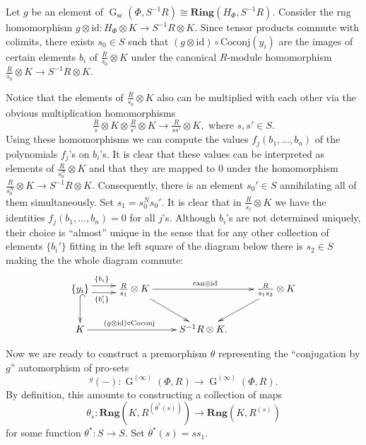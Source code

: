 \documentclass[oneside, 11pt]{amsart}
\numberwithin{equation}{section}
\theoremstyle{definition}
\theoremstyle{remark}
\DeclareMathOperator\GG{G}
\newcommand{\Rng}{\mathbf{Rng}}
\newcommand{\up}[2]{{^{#1}\!{#2}}}
\begin{document}
Let $g$ be an element of $\GG_{\mathrm{sc}}(\Phi, S^{-1} R) \cong \mathbf{Ring}(H_\Phi, S^{-1}R)$. Consider the rng homomorphism \(g \otimes \mathrm{id} \colon H_\Phi \otimes K \to S^{-1} R \otimes K\).
Since tensor products commute with colimits, there exists \(s_0 \in S\) such that \((g \otimes \mathrm{id})\circ \mathrm{Coconj}(y_i)\) are the images of certain elements $b_i$ of $\frac R{s_0} \otimes K$ under the canonical $R$-module homomorphism $ \tfrac R{s_0} \otimes K \to S^{-1}R \otimes K.$

Notice that the elements of $\tfrac R {s_0} \otimes K$ also can be multiplied with each other via the obvious multiplication homomorphisms
\[ \tfrac R {s} \otimes K \otimes \tfrac R {s'} \otimes K \to \tfrac R {ss'} \otimes K,\text{ where } s,s'\in S. \]
Using these homomorphisms we can compute the values $f_j(b_1,\ldots, b_n)$ of the polynomials $f_j$'s on $b_i$'s.
It is clear that these values can be interpreted as elements of $\frac R {s_0^N}\otimes K$ and that they are mapped to $0$ under the homomorphism $\frac R {s_0^N} \otimes K \to S^{-1}R \otimes K$. Consequently, there is an element $s_0' \in S$ annihilating all of them simultaneously. Set $s_1 = s_0^N s_0'$. It is clear that in $\frac R{s_1} \otimes K$ we have the identities \(f_j(b_1, \ldots, b_n) = 0\) for all \(j\)'s. Although $b_i$'s are not determined uniquely, their choice is ``almost'' unique in the sense that for any other collection of elements $\{b_i'\}$ fitting in the left square of the diagram below there is $s_2\in S$ making the the whole diagram commute:
\begin{equation} \label{eq:bis} \begin{aligned} \xymatrix{ \{y_i\} \ar@<3.5pt>[r]^(0.4){\{b_i\}} \ar@<-3.5pt>[r]_(0.4){\{b_i'\}} \ar@{^{(}->}[d] & \tfrac R {s_1} \otimes K \ar[rd] \ar[rr]^{\mathrm{can}\otimes \mathrm{id}} & & \tfrac R {s_1 s_2} \otimes K \ar[ld] \\ K \ar[rr]^(.4){(g\otimes \mathrm{id})\circ \mathrm{Coconj}} & & S^{-1} R \otimes K. }\end{aligned} \end{equation}

Now we are ready to construct a premorphism $\theta$ representing the ``conjugation by $g$'' automorphism of pro-sets
\begin{equation} \label{eq:conj-g} \up g{(-)} \colon \GG^{(\infty)}(\Phi, R) \to \GG^{(\infty)}(\Phi, R).\end{equation}
By definition, this amounts to constructing a collection of maps
\[\theta_{s}\colon \Rng(K, R^{(\theta^*(s))}) \to \Rng(K, R^{(s)})\]
for some function $\theta^* \colon S \to S$. Set $\theta^*(s) = ss_1$.
\end{document}
